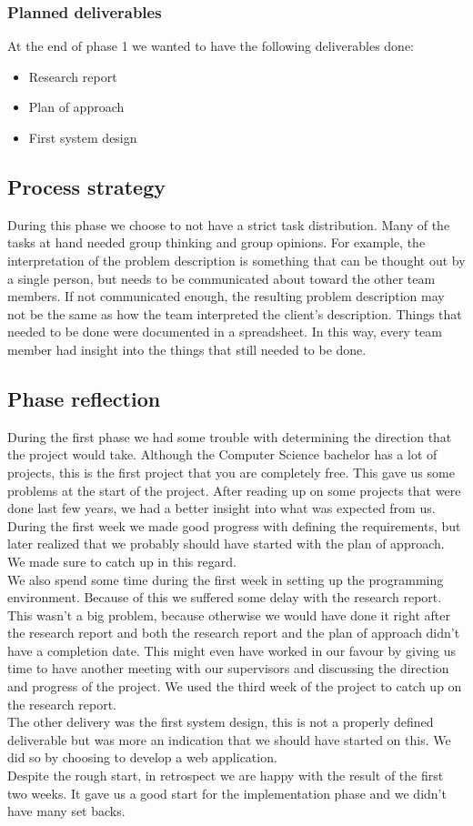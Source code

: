 \subsubsection{Planned deliverables}
At the end of phase 1 we wanted to have the following deliverables done:
\begin{itemize}
\item Research report
\item Plan of approach
\item First system design
\end{itemize}

\subsection{Process strategy}
During this phase we choose to not have a strict task distribution.
Many of the tasks at hand needed group thinking and group opinions.
For example, the interpretation of the problem description is something that can be thought out by a single person, but needs to be communicated about toward the other team members.
If not communicated enough, the resulting problem description may not be the same as how the team interpreted the client's description.
Things that needed to be done were documented in a spreadsheet.
In this way, every team member had insight into the things that still needed to be done.

\subsection{Phase reflection}
During the first phase we had some trouble with determining the direction that the project would take.
Although the Computer Science bachelor has a lot of projects, this is the first project that you are completely free.
This gave us some problems at the start of the project.
After reading up on some projects that were done last few years, we had a better insight into what was expected from us.
During the first week we made good progress with defining the requirements, but later realized that we probably should have started with the plan of approach.
We made sure to catch up in this regard.\\
We also spend some time during the first week in setting up the programming environment.
Because of this we suffered some delay with the research report.
This wasn't a big problem, because otherwise we would have done it right after the research report and both the research report and the plan of approach didn't have a completion date.
This might even have worked in our favour by giving us time to have another meeting with our supervisors and discussing the direction and progress of the project.
We used the third week of the project to catch up on the research report.\\
The other delivery was the first system design, this is not a properly defined deliverable but was more an indication that we should have started on this.
We did so by choosing to develop a web application.\\
Despite the rough start, in retrospect we are happy with the result of the first two weeks.
It gave us a good start for the implementation phase and we didn't have many set backs.

